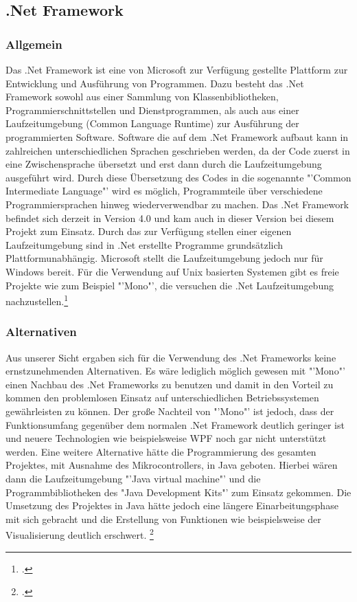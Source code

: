 \subsection{.Net Framework}
\subsubsection{Allgemein}
Das .Net Framework ist eine von Microsoft zur Verfügung gestellte Plattform zur Entwicklung und Ausführung von Programmen. Dazu  besteht das .Net Framework sowohl aus einer Sammlung von Klassenbibliotheken, Programmierschnittstellen und Dienstprogrammen, als auch aus einer Laufzeitumgebung (Common Language Runtime) zur Ausführung der programmierten Software.
Software die auf dem .Net Framework aufbaut kann in zahlreichen unterschiedlichen Sprachen geschrieben werden, da der Code zuerst in eine Zwischensprache übersetzt und erst dann durch die Laufzeitumgebung ausgeführt wird. Durch diese Übersetzung des Codes in die sogenannte "'Common Intermediate Language"' wird es möglich, Programmteile über verschiedene Programmiersprachen hinweg wiederverwendbar zu machen. 
Das .Net Framework befindet sich derzeit in Version 4.0 und kam auch in dieser Version bei diesem Projekt zum Einsatz.
Durch das zur Verfügung stellen einer eigenen Laufzeitumgebung sind in .Net erstellte Programme grundsätzlich Plattformunabhängig. Microsoft stellt die Laufzeitumgebung jedoch nur für Windows bereit. Für die Verwendung auf Unix basierten Systemen gibt es freie Projekte wie zum Beispiel "'Mono"', die versuchen die .Net Laufzeitumgebung nachzustellen.\footcite[vgl.][]{dotnetwiki}

\subsubsection{Alternativen}
Aus unserer Sicht ergaben sich für die Verwendung des .Net Frameworks keine ernstzunehmenden Alternativen. Es wäre lediglich möglich gewesen  mit "'Mono"' einen Nachbau des .Net Frameworks zu benutzen und damit in den Vorteil zu kommen den problemlosen Einsatz auf unterschiedlichen Betriebssystemen gewährleisten zu können. Der große Nachteil von "'Mono"' ist jedoch, dass der Funktionsumfang gegenüber dem normalen .Net Framework deutlich geringer ist und neuere Technologien wie beispielsweise WPF noch gar nicht unterstützt werden. 
Eine weitere Alternative hätte die Programmierung des gesamten Projektes, mit Ausnahme des Mikrocontrollers, in Java geboten. Hierbei wären dann die Laufzeitumgebung "'Java virtual machine"' und die Programmbibliotheken des "Java Development Kits"' zum Einsatz gekommen. Die Umsetzung des Projektes in Java hätte jedoch eine längere Einarbeitungsphase mit sich gebracht und die Erstellung von Funktionen wie beispielsweise der Visualisierung deutlich erschwert. \footcite[vgl.][]{dotnetalternative}

